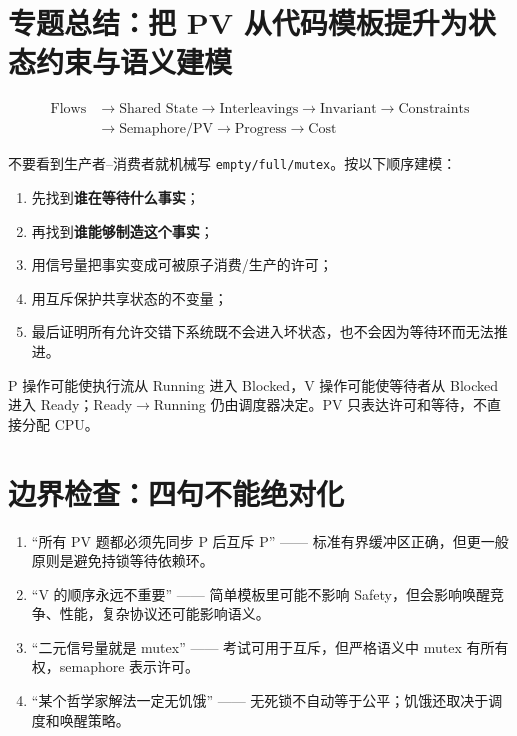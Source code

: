 \documentclass[11pt,a4paper]{ctexart}
\newcommand{\kw}[1]{\textbf{#1}}
\newcommand{\code}[1]{\texttt{#1}}
\begin{document}
\section{专题总结：把 PV 从代码模板提升为状态约束与语义建模}

\begin{corebox}[最终核心模型]
\[
\boxed{
\begin{aligned}
\text{Flows}&\to\text{Shared State}\to\text{Interleavings}\to\text{Invariant}\to\text{Constraints}\\
&\to\text{Semaphore/PV}\to\text{Progress}\to\text{Cost}
\end{aligned}}
\]
\end{corebox}

不要看到生产者--消费者就机械写 \code{empty/full/mutex}。按以下顺序建模：
\begin{enumerate}
\item 先找到\kw{谁在等待什么事实}；
\item 再找到\kw{谁能够制造这个事实}；
\item 用信号量把事实变成可被原子消费/生产的许可；
\item 用互斥保护共享状态的不变量；
\item 最后证明所有允许交错下系统既不会进入坏状态，也不会因为等待环而无法推进。
\end{enumerate}

\begin{method}[与进程调度的接口]
P 操作可能使执行流从 Running 进入 Blocked，V 操作可能使等待者从 Blocked 进入 Ready；Ready$\to$Running 仍由调度器决定。PV 只表达许可和等待，不直接分配 CPU。
\end{method}

\section*{边界检查：四句不能绝对化}

\begin{warn}[四句不应绝对化的话]
\begin{enumerate}
\item “所有 PV 题都必须先同步 P 后互斥 P” —— 标准有界缓冲区正确，但更一般原则是避免持锁等待依赖环。
\item “V 的顺序永远不重要” —— 简单模板里可能不影响 Safety，但会影响唤醒竞争、性能，复杂协议还可能影响语义。
\item “二元信号量就是 mutex” —— 考试可用于互斥，但严格语义中 mutex 有所有权，semaphore 表示许可。
\item “某个哲学家解法一定无饥饿” —— 无死锁不自动等于公平；饥饿还取决于调度和唤醒策略。
\end{enumerate}
\end{warn}
\end{document}
